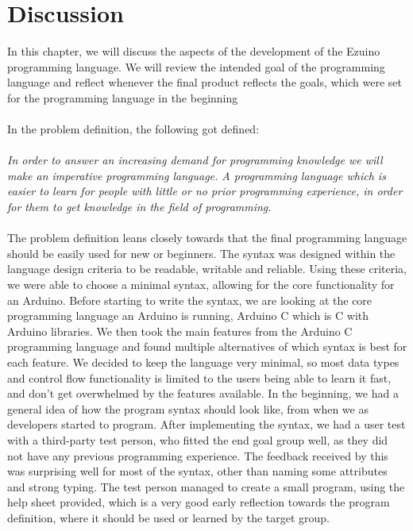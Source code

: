 \chapter{Discussion}
In this chapter, we will discuss the aspects of the development of the Ezuino programming language. We will review the intended goal of the programming language and reflect whenever the final product reflects the goals, which were set for the programming language in the beginning
\\\\
In the problem definition, the following got defined:
\\\\
\textit{In order to answer an increasing demand for programming knowledge we will make an imperative programming language. A programming language which is easier to learn for people with little or no prior programming experience, in order for them to get knowledge in the field of programming.}
\\\\
The problem definition leans closely towards that the final programming language should be easily used for new or beginners. The syntax was designed within the language design criteria to be readable, writable and reliable. Using these criteria, we were able to choose a minimal syntax, allowing for the core functionality for an Arduino. Before starting to write the syntax, we are looking at the core programming language an Arduino is running, Arduino C which is C with Arduino libraries. We then took the main features from the Arduino C programming language and found multiple alternatives of which syntax is best for each feature. We decided to keep the language very minimal, so most data types and control flow functionality is limited to the users being able to learn it fast, and don’t get overwhelmed by the features available. In the beginning, we had a general idea of how the program syntax should look like, from when we as developers started to program. After implementing the syntax, we had a user test with a third-party test person, who fitted the end goal group well, as they did not have any previous programming experience. The feedback received by this was surprising well for most of the syntax, other than naming some attributes and strong typing. The test person managed to create a small program, using the help sheet provided, which is a very good early reflection towards the program definition, where it should be used or learned by the target group.
\\\\
